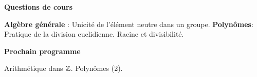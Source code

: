 \bigskip
\begin{center}
 \textbf{Questions de cours}
 \end{center}
\textbf{Algèbre générale} :
 Unicité de l'élément neutre dans un groupe.\newline
\textbf{Polynômes}:\newline
Pratique de la division euclidienne. Racine et divisibilité. 


\begin{center}
 \textbf{Prochain programme}
\end{center}

Arithmétique dans $\mathbb{Z}$. Polynômes (2).


